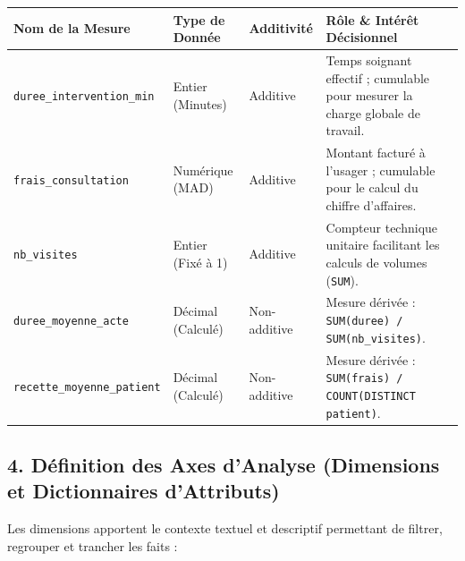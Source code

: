 \documentclass[11pt, a4paper]{article}
\begin{document}
\begin{center}
\renewcommand{\arraystretch}{1.3}
\begin{tabularx}{\textwidth}{p{4.2cm} p{2.8cm} p{2.5cm} X}
\toprule
\textbf{Nom de la Mesure} & \textbf{Type de Donnée} & \textbf{Additivité} & \textbf{Rôle \& Intérêt Décisionnel} \\
\midrule
\texttt{duree\_intervention\_min} & Entier (Minutes) & Additive & Temps soignant effectif ; cumulable pour mesurer la charge globale de travail. \\
\texttt{frais\_consultation} & Numérique (MAD) & Additive & Montant facturé à l'usager ; cumulable pour le calcul du chiffre d'affaires. \\
\texttt{nb\_visites} & Entier (Fixé à 1) & Additive & Compteur technique unitaire facilitant les calculs de volumes (\texttt{SUM}). \\
\texttt{duree\_moyenne\_acte} & Décimal (Calculé) & Non-additive & Mesure dérivée : \texttt{SUM(duree) / SUM(nb\_visites)}. \\
\texttt{recette\_moyenne\_patient} & Décimal (Calculé) & Non-additive & Mesure dérivée : \texttt{SUM(frais) / COUNT(DISTINCT patient)}. \\
\bottomrule
\end{tabularx}
\end{center}

\subsection{4. Définition des Axes d'Analyse (Dimensions et Dictionnaires d'Attributs)}

\noindent Les dimensions apportent le contexte textuel et descriptif permettant de filtrer, regrouper et trancher les faits :
\end{document}
